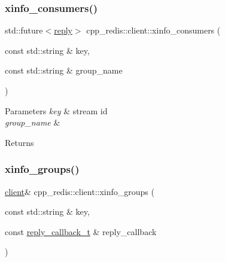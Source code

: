 \subsubsection{\texorpdfstring{xinfo\+\_\+consumers()}{xinfo\_consumers()}\hspace{0.1cm}{\footnotesize\ttfamily [2/2]}}
{\footnotesize\ttfamily std\+::future$<$\mbox{\hyperlink{classcpp__redis_1_1reply}{reply}}$>$ cpp\+\_\+redis\+::client\+::xinfo\+\_\+consumers (\begin{DoxyParamCaption}\item[{const std\+::string \&}]{key,  }\item[{const std\+::string \&}]{group\+\_\+name }\end{DoxyParamCaption})}






\begin{DoxyParams}{Parameters}
{\em key} & stream id \\
\hline
{\em group\+\_\+name} & \\
\hline
\end{DoxyParams}
\begin{DoxyReturn}{Returns}

\end{DoxyReturn}
\mbox{\label{classcpp__redis_1_1client_a99175a1ba56a05cc75c531860aaf5442}} 
\subsubsection{\texorpdfstring{xinfo\+\_\+groups()}{xinfo\_groups()}\hspace{0.1cm}{\footnotesize\ttfamily [1/2]}}
{\footnotesize\ttfamily \mbox{\hyperlink{classcpp__redis_1_1client}{client}}\& cpp\+\_\+redis\+::client\+::xinfo\+\_\+groups (\begin{DoxyParamCaption}\item[{const std\+::string \&}]{key,  }\item[{const \mbox{\hyperlink{classcpp__redis_1_1client_af7a65eb21aa25230bfbb0b0203c4fc04}{reply\+\_\+callback\+\_\+t}} \&}]{reply\+\_\+callback }\end{DoxyParamCaption})}






